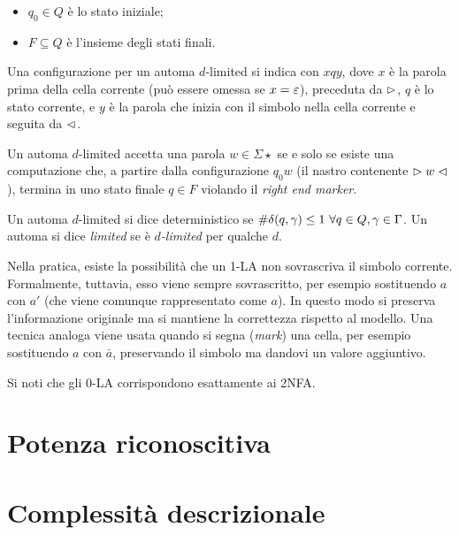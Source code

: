 \begin{defin}
\begin{itemize}
		\item $q_0\in Q$ è lo stato iniziale;
		\item $F\subseteq Q$ è l'insieme degli stati finali.
	\end{itemize}
	Una configurazione per un automa $d$-limited si indica con $xqy$, dove $x$ è la parola prima della cella corrente (può essere omessa se $x=\varepsilon$), preceduta da $\vartriangleright$, $q$ è lo stato corrente, e $y$ è la parola che inizia con il simbolo nella cella corrente e seguita da $\vartriangleleft$.

	Un automa $d$-limited accetta una parola $w\in\Sigma\star$ se e solo se esiste una computazione che, a partire dalla configurazione $q_0w$ (il nastro contenente $\vartriangleright w\vartriangleleft$), termina in uno stato finale $q\in F$ violando il \emph{right end marker}.

	Un automa $d$-limited si dice deterministico se $\# \delta(q,\gamma)\leq 1 ~ \forall q\in Q,\gamma\in\Gamma$. Un automa si dice \emph{limited} se è \emph{$d$-limited} per qualche $d$.
\end{defin}
Nella pratica, esiste la possibilità che un 1-LA non sovrascriva il simbolo corrente. Formalmente, tuttavia, esso viene sempre sovrascritto, per esempio sostituendo $a$ con $a'$ (che viene comunque rappresentato come $a$). In questo modo si preserva l'informazione originale ma si mantiene la correttezza rispetto al modello. Una tecnica analoga viene usata quando si segna (\emph{mark}) una cella, per esempio sostituendo $a$ con $\bar a$, preservando il simbolo ma dandovi un valore aggiuntivo.

Si noti che gli 0-LA corrispondono esattamente ai 2NFA.



\section{Potenza riconoscitiva}



\section{Complessità descrizionale}
